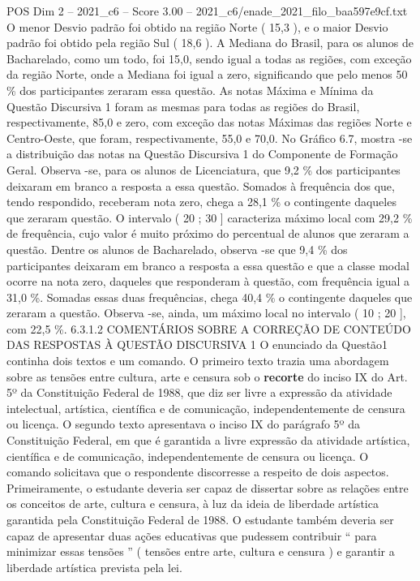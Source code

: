 \begin{textsample}{POS Dim 2 – 2021\_c6 – Score 3.00 – 2021\_c6/enade\_2021\_filo\_baa597e9cf.txt}
O menor Desvio padrão foi obtido na região Norte ( 15,3 ), e o maior Desvio padrão foi obtido pela região Sul ( 18,6 ).
A Mediana do Brasil, para os alunos de Bacharelado, como um todo, foi 15,0, sendo igual a todas as regiões, com exceção da região Norte, onde a Mediana foi igual a zero, significando que pelo menos 50 \% dos participantes zeraram essa questão.
As notas Máxima e Mínima da Questão Discursiva 1 foram as mesmas para todas as regiões do Brasil, respectivamente, 85,0 e zero, com exceção das notas Máximas das regiões Norte e Centro-Oeste, que foram, respectivamente, 55,0 e 70,0.
No Gráfico 6.7, mostra -se a distribuição das notas na Questão Discursiva 1 do Componente de Formação Geral.
Observa -se, para os alunos de Licenciatura, que 9,2 \% dos participantes deixaram em branco a resposta a essa questão.
Somados à frequência dos que, tendo respondido, receberam nota zero, chega a 28,1 \% o contingente daqueles que zeraram questão.
O intervalo ( 20 ; 30 ] caracteriza máximo local com 29,2 \% de frequência, cujo valor é muito próximo do percentual de alunos que zeraram a questão.
Dentre os alunos de Bacharelado, observa -se que 9,4 \% dos participantes deixaram em branco a resposta a essa questão e que a classe modal ocorre na nota zero, daqueles que responderam à questão, com frequência igual a 31,0 \%.
Somadas essas duas frequências, chega 40,4 \% o contingente daqueles que zeraram a questão.
Observa -se, ainda, um máximo local no intervalo ( 10 ; 20 ], com 22,5 \%. 6.3.1.2 COMENTÁRIOS SOBRE A CORREÇÃO DE CONTEÚDO DAS RESPOSTAS À QUESTÃO DISCURSIVA 1 O enunciado da Questão1 continha dois textos e um comando.
O primeiro texto trazia uma abordagem sobre as tensões entre cultura, arte e censura sob o \textbf{recorte} do inciso IX do Art. 5º da Constituição Federal de 1988, que diz ser livre a expressão da atividade intelectual, artística, científica e de comunicação, independentemente de censura ou licença.
O segundo texto apresentava o inciso IX do parágrafo 5º da Constituição Federal, em que é garantida a livre expressão da atividade artística, científica e de comunicação, independentemente de censura ou licença.
O comando solicitava que o respondente discorresse a respeito de dois aspectos.
Primeiramente, o estudante deveria ser capaz de dissertar sobre as relações entre os conceitos de arte, cultura e censura, à luz da ideia de liberdade artística garantida pela Constituição Federal de 1988.
O estudante também deveria ser capaz de apresentar duas ações educativas que pudessem contribuir “ para minimizar essas tensões ” ( tensões entre arte, cultura e censura ) e garantir a liberdade artística prevista pela lei.

\end{textsample}
